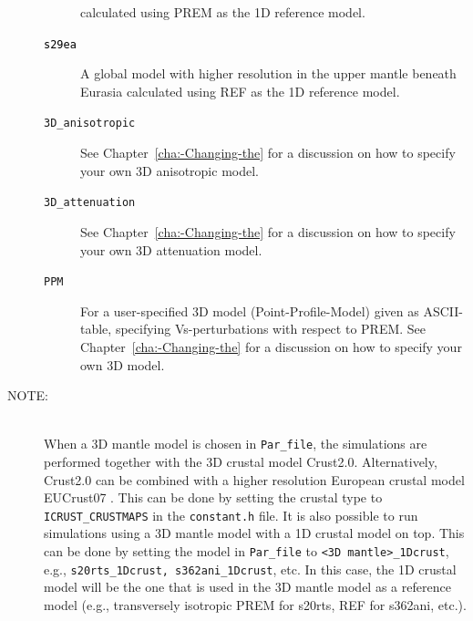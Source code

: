 \documentclass[oneside,english]{book}
\begin{document}
\begin{description}
\begin{description}
calculated using PREM as the 1D reference model.
\item [{\texttt{\textcolor{black}{s29ea}}}] A global model with higher
resolution in the upper mantle beneath Eurasia calculated using REF
as the 1D reference model.
\item [{\texttt{3D\_anisotropic}}] See Chapter~\ref{cha:-Changing-the}
for a discussion on how to specify your own 3D anisotropic model.
\item [{\texttt{3D\_attenuation}}] See Chapter~\ref{cha:-Changing-the}
for a discussion on how to specify your own 3D attenuation model.
\item [{\texttt{PPM}}] For a user-specified 3D model (Point-Profile-Model)
given as ASCII-table, specifying Vs-perturbations
with respect to PREM. See Chapter~\ref{cha:-Changing-the}
for a discussion on how to specify your own 3D model.
\end{description}
\item [{\textmd{NOTE:}}]~\\
When a 3D mantle model is chosen in \texttt{Par\_file}, the simulations are performed together with the 3D crustal model Crust2.0. Alternatively, Crust2.0 can be combined with a higher resolution European crustal model EUCrust07 \citep{EUCrust07}. This can be done by setting the crustal type to \texttt{ICRUST\_CRUSTMAPS} in the \texttt{constant.h} file.
It is also possible to run simulations using a 3D mantle model with a 1D crustal model on top. This can be done by setting the model in \texttt{Par\_file} to \texttt{<3D mantle>\_1Dcrust}, e.g., \texttt{s20rts\_1Dcrust, s362ani\_1Dcrust}, etc. In this case, the 1D crustal model will be the one that is used in the 3D mantle model as a reference model (e.g., transversely isotropic PREM for s20rts, REF for s362ani, etc.).


\end{description}
\end{document}
